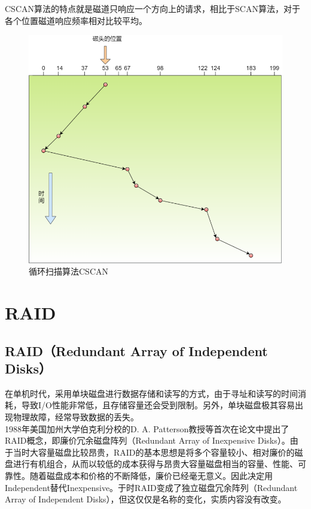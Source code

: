 CSCAN算法的特点就是磁道只响应一个方向上的请求，相比于SCAN算法，对于各个位置磁道响应频率相对比较平均。

\begin{figure}[H]
    \centering
    \includegraphics[scale=1.3]{img/C4/4-4/4.png}
    \caption{循环扫描算法CSCAN}
\end{figure}

\newpage

\section{RAID}

\subsection{RAID（Redundant Array of Independent Disks）}

在单机时代，采用单块磁盘进行数据存储和读写的方式，由于寻址和读写的时间消耗，导致I/O性能非常低，且存储容量还会受到限制。另外，单块磁盘极其容易出现物理故障，经常导致数据的丢失。\\

1988年美国加州大学伯克利分校的D. A. Patterson教授等首次在论文中提出了RAID概念，即廉价冗余磁盘阵列（Redundant Array of Inexpensive Disks）。由于当时大容量磁盘比较昂贵，RAID的基本思想是将多个容量较小、相对廉价的磁盘进行有机组合，从而以较低的成本获得与昂贵大容量磁盘相当的容量、性能、可靠性。随着磁盘成本和价格的不断降低，廉价已经毫无意义。因此决定用Independent替代Inexpensive。于时RAID变成了独立磁盘冗余阵列（Redundant Array of Independent Disks），但这仅仅是名称的变化，实质内容没有改变。\\

